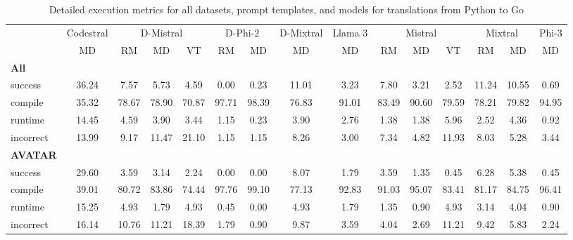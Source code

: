 \begin{table}[t]
\caption{Detailed execution metrics for all datasets, prompt templates, and models for translations from Python to Go}
\label{tab:iteration_1_stats_percent_Python_Go}

\setlength{\tabcolsep}{2.5pt} %
\renewcommand{\arraystretch}{1} %

\footnotesize
\begin{tabular}{@{}lcccccccccccccc@{}}
\toprule
 & Codestral & \multicolumn{3}{c}{D-Mistral} & \multicolumn{2}{c}{D-Phi-2} & D-Mixtral & Llama 3 & \multicolumn{3}{c}{Mistral}  & \multicolumn{2}{c}{Mixtral} & Phi-3 \\ 

\cmidrule(l){2-2}
\cmidrule(l){3-5}
\cmidrule(l){6-7}
\cmidrule(l){8-8}
\cmidrule(l){9-9}
\cmidrule(l){10-12}
\cmidrule(l){13-14}
\cmidrule(l){15-15}

& \multicolumn{1}{c}{MD}
& \multicolumn{1}{c}{RM}
& \multicolumn{1}{c}{MD}
& \multicolumn{1}{c}{VT}
& \multicolumn{1}{c}{RM}
& \multicolumn{1}{c}{MD} 
& \multicolumn{1}{c}{MD} 
& \multicolumn{1}{c}{MD} 
& \multicolumn{1}{c}{RM} 
& \multicolumn{1}{c}{MD} 
& \multicolumn{1}{c}{VT} 
& \multicolumn{1}{c}{RM}
& \multicolumn{1}{c}{MD} 
& \multicolumn{1}{c}{MD} \\

\midrule
\textbf{All} & & & & & & & & & & & & & & \\ 
\quad success & 36.24 & 7.57 & 5.73 & 4.59 & 0.00 & 0.23 & 11.01 & 3.23 & 7.80 & 3.21 & 2.52 & 11.24 & 10.55 & 0.69 \\
\qquad compile & 35.32 & 78.67 & 78.90 & 70.87 & 97.71 & 98.39 & 76.83 & 91.01 & 83.49 & 90.60 & 79.59 & 78.21 & 79.82 & 94.95 \\
\qquad runtime & 14.45 & 4.59 & 3.90 & 3.44 & 1.15 & 0.23 & 3.90 & 2.76 & 1.38 & 1.38 & 5.96 & 2.52 & 4.36 & 0.92 \\
\qquad incorrect & 13.99 & 9.17 & 11.47 & 21.10 & 1.15 & 1.15 & 8.26 & 3.00 & 7.34 & 4.82 & 11.93 & 8.03 & 5.28 & 3.44 \\
 

\textbf{AVATAR} & & & & & & & & & & & & & & \\
\quad success & 29.60 & 3.59 & 3.14 & 2.24 & 0.00 & 0.00 & 8.07 & 1.79 & 3.59 & 1.35 & 0.45 & 6.28 & 5.38 & 0.45 \\
\qquad compile & 39.01 & 80.72 & 83.86 & 74.44 & 97.76 & 99.10 & 77.13 & 92.83 & 91.03 & 95.07 & 83.41 & 81.17 & 84.75 & 96.41 \\
\qquad runtime & 15.25 & 4.93 & 1.79 & 4.93 & 0.45 & 0.00 & 4.93 & 1.79 & 1.35 & 0.90 & 4.93 & 3.14 & 4.04 & 0.90 \\
\qquad incorrect & 16.14 & 10.76 & 11.21 & 18.39 & 1.79 & 0.90 & 9.87 & 3.59 & 4.04 & 2.69 & 11.21 & 9.42 & 5.83 & 2.24 \\
 


\end{tabular}
\end{table}
